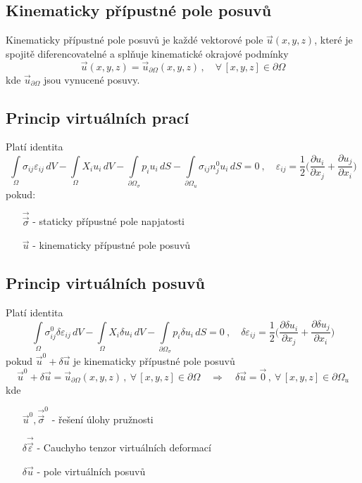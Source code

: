 \documentclass[10pt,oneside]{article}
\newcommand{\tenz}[1]{\vec{\vec{#1}}}
\begin{document}
\subsection*{Kinematicky přípustné pole posuvů}
%
Kinematicky přípustné pole posuvů je každé vektorové pole $\vec{u}(x,y,z)$, které je spojitě diferencovatelné a splňuje kinematické okrajové podmínky
%
\begin{equation*}
\vec{u}(x,y,z) = \vec{u}_{\partial\Omega}(x,y,z) \,,\quad \forall\,[x,y,z] \in \partial\Omega
\end{equation*}
%
kde $\vec{u}_{\partial\Omega}$ jsou vynucené posuvy.

\newpage
\subsection*{Princip virtuálních prací}
%
Platí identita
%
\begin{equation*}
	\int\limits_\Omega \sigma_{ij} \varepsilon_{ij} \,dV - \int\limits_\Omega X_i u_i \,dV - \int\limits_{\partial\Omega_\sigma} p_i u_i \,dS - \int\limits_{\partial\Omega_u} \sigma_{ij} n^0_j u_i \,dS = 0
	\ ,\quad
	\varepsilon_{ij} = \frac{1}{2} \bigg(\frac{\partial u_i}{\partial x_j} + \frac{\partial u_j}{\partial x_i} \bigg)
\end{equation*}
%
pokud:
\begin{itemize}
\item[$\tenz{\sigma}$] - staticky přípustné pole napjatosti
\item[$\vec{u}$] - kinematicky přípustné pole posuvů
\end{itemize}


\subsection*{Princip virtuálních posuvů}
%
Platí identita
%
\begin{equation*}
	\int\limits_\Omega \sigma_{ij}^0 \delta\varepsilon_{ij} \,dV - \int\limits_\Omega X_i \delta u_i \,dV - \int\limits_{\partial\Omega_\sigma} p_i \delta u_i \,dS = 0
	\ ,\quad
	\delta\varepsilon_{ij} = \frac{1}{2} \bigg(\frac{\partial \delta u_i}{\partial x_j} + \frac{\partial \delta u_j}{\partial x_i} \bigg)
\end{equation*}
%
pokud $\vec{u}^0 + \delta\vec{u}$ je kinematicky přípustné pole posuvů
%
\begin{equation*}
	\vec{u}^0 + \delta\vec{u} = \vec{u}_{\partial\Omega}(x,y,z) \,,\ \forall\,[x,y,z] \in \partial\Omega
	\quad \Rightarrow \quad
	\delta\vec{u} = \vec{0} \,,\ \forall\,[x,y,z] \in \partial\Omega_u
\end{equation*}
%
kde
%
\begin{itemize}[leftmargin=15mm]
	\item[$\vec{u}^0,\tenz{\sigma}^0$] - řešení úlohy pružnosti
	\item[$\delta\tenz{\varepsilon}$] - Cauchyho tenzor virtuálních deformací
	\item[$\delta\vec{u}$] - pole virtuálních posuvů %
\end{itemize}
\end{document}
